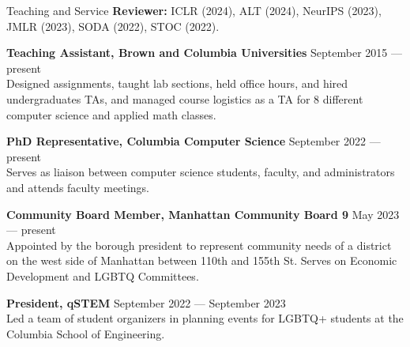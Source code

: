 \documentclass{resume} %
\begin{document}
\begin{rSection}{Teaching and Service} \itemsep -2pt
\textbf{Reviewer:} ICLR (2024), ALT (2024), NeurIPS (2023), JMLR (2023), SODA (2022), STOC (2022). 


\textbf{Teaching Assistant, Brown and Columbia Universities} \hfill September 2015 --- present \\
Designed assignments, taught lab sections, held office hours, and hired undergraduates TAs, and managed course logistics as a TA for 8 different computer science and applied math classes.


\textbf{PhD Representative, Columbia Computer Science} \hfill September 2022 --- present \\
Serves as liaison between computer science students, faculty, and administrators and attends faculty meetings.

\textbf{Community Board Member, Manhattan Community Board 9} \hfill May 2023 --- present \\
Appointed by the borough president to represent community needs of a district on the west side of Manhattan between 110th and 155th St. Serves on Economic Development and LGBTQ Committees.

\textbf{President, qSTEM} \hfill September 2022 --- September 2023 \\
Led a team of student organizers in planning events for LGBTQ+ students at the Columbia School of Engineering. 


\end{rSection}
\end{document}
